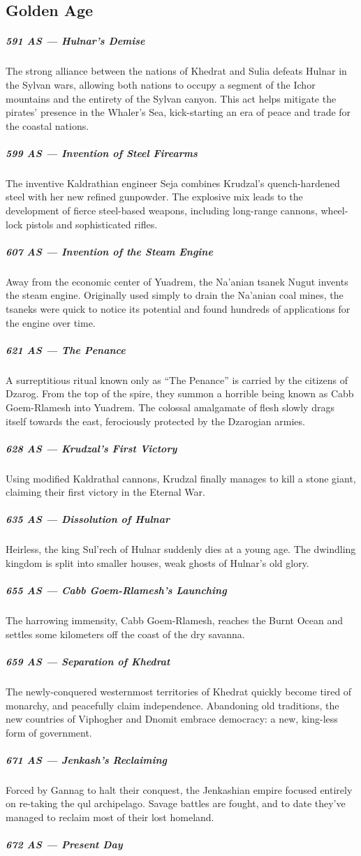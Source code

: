 \subsection*{Golden Age}
\subparagraph{591 AS --- Hulnar's Demise} The strong alliance between the nations of Khedrat and Sulia defeats Hulnar in the Sylvan wars, allowing both nations to occupy a segment of the Ichor mountains and the entirety of the Sylvan canyon.
This act helps mitigate the pirates' presence in the Whaler's Sea, kick-starting an era of peace and trade for the coastal nations.

\subparagraph{599 AS --- Invention of Steel Firearms} The inventive Kaldrathian engineer Seja combines Krudzal's quench-hardened steel with her new refined gunpowder.
The explosive mix leads to the development of fierce steel-based weapons, including long-range cannons, wheel-lock pistols and sophisticated rifles.

\subparagraph{607 AS --- Invention of the Steam Engine} Away from the economic center of Yuadrem, the Na'anian tsanek Nugut invents the steam engine.
Originally used simply to drain the Na'anian coal mines, the tsaneks were quick to notice its potential and found hundreds of applications for the engine over time.

\subparagraph{621 AS --- The Penance} A surreptitious ritual known only as ``The Penance'' is carried by the citizens of Dzarog.
From the top of the spire, they summon a horrible being known as Cabb Goem-Rlamesh into Yuadrem.
The colossal amalgamate of flesh slowly drags itself towards the east, ferociously protected by the Dzarogian armies.

\subparagraph{628 AS --- Krudzal's First Victory} Using modified Kaldrathal cannons, Krudzal finally manages to kill a stone giant, claiming their first victory in the Eternal War.

\subparagraph{635 AS --- Dissolution of Hulnar} Heirless, the king Sul'rech of Hulnar suddenly dies at a young age.
The dwindling kingdom is split into smaller houses, weak ghosts of Hulnar's old glory.

\subparagraph{655 AS --- Cabb Goem-Rlamesh's Launching} The harrowing immensity, Cabb Goem-Rlamesh, reaches the Burnt Ocean and settles some kilometers off the coast of the dry savanna.

\subparagraph{659 AS --- Separation of Khedrat} The newly-conquered westernmost territories of Khedrat quickly become tired of monarchy, and peacefully claim independence.
Abandoning old traditions, the new countries of Viphogher and Dnomit embrace democracy: a new, king-less form of government.

\subparagraph{671 AS --- Jenkash's Reclaiming} Forced by Gannag to halt their conquest, the Jenkashian empire focused entirely on re-taking the qul archipelago.
Savage battles are fought, and to date they've managed to reclaim most of their lost homeland.

\subparagraph{672 AS --- Present Day}

\newpage
